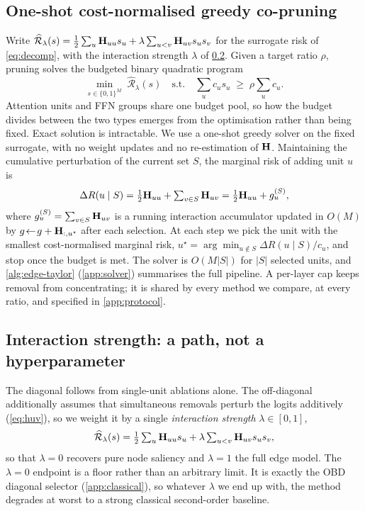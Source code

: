 \subsection{One-shot cost-normalised greedy co-pruning}
\label{sec:method-solver}

Write $\widehat{\mathcal R}_\lambda(s)=\tfrac12\sum_u\mathbf{H}_{uu}s_u+\lambda\sum_{u<v}\mathbf{H}_{uv}s_us_v$ for
the surrogate risk of \cref{eq:decomp}, with the interaction strength $\lambda$ of
\cref{sec:method-lambda}. Given a target ratio $\rho$, pruning solves the budgeted binary quadratic
program
\begin{equation}
\min_{s\in\{0,1\}^M}\;\widehat{\mathcal R}_\lambda(s)
\quad\text{s.t.}\quad \textstyle\sum_{u}c_u s_u\;\ge\;\rho\textstyle\sum_u c_u .
\label{eq:objective}
\end{equation}
Attention units and FFN groups share one budget pool, so how the budget divides between the two types
emerges from the optimisation rather than being fixed. Exact solution is intractable. We use a one-shot
greedy solver on the fixed surrogate, with no weight updates and no re-estimation of $\mathbf{H}$.
Maintaining the cumulative perturbation of the current set $S$, the marginal risk of adding unit $u$
is
\begin{equation}
\Delta R(u\mid S)=\tfrac12 \mathbf{H}_{uu}+\textstyle\sum_{v\in S}\mathbf{H}_{uv}=\tfrac12\mathbf{H}_{uu}+g_u^{(S)},
\label{eq:marginal}
\end{equation}
where $g_u^{(S)}=\sum_{v\in S}\mathbf{H}_{uv}$ is a running interaction accumulator updated in $O(M)$ by
$g\!\leftarrow\! g+\mathbf{H}_{:,u^\star}$ after each selection. At each step we pick the unit with the
smallest cost-normalised marginal risk, $u^\star=\arg\min_{u\notin S}\Delta R(u\mid S)/c_u$, and
stop once the budget is met. The solver is $O(M|S|)$ for $|S|$ selected units, and \cref{alg:edge-taylor} (\cref{app:solver})
summarises the full pipeline. A per-layer cap keeps removal from concentrating; it is shared by every
method we compare, at every ratio, and specified in \cref{app:protocol}.

\subsection{Interaction strength: a path, not a hyperparameter}
\label{sec:method-lambda}

The diagonal follows from single-unit ablations alone. The off-diagonal additionally assumes that
simultaneous removals perturb the logits additively (\cref{eq:huv}), so we weight it by a single
\emph{interaction strength} $\lambda\in[0,1]$,
\begin{equation}
\widehat{\mathcal R}_\lambda(s)=\tfrac12\textstyle\sum_u\mathbf{H}_{uu}s_u
+\lambda\textstyle\sum_{u<v}\mathbf{H}_{uv}s_u s_v,
\label{eq:lambda}
\end{equation}
so that $\lambda\!=\!0$ recovers pure node saliency and $\lambda\!=\!1$ the full edge model. The $\lambda\!=\!0$ endpoint is a floor rather than an arbitrary limit. It is exactly the OBD diagonal
selector (\cref{app:classical}), so whatever $\lambda$ we end up with, the method degrades at worst to
a strong classical second-order baseline.

